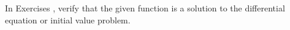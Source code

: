 {\noindent In Exercises}
{, verify that the given function is a solution to the differential equation or initial value problem.}

